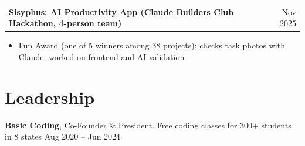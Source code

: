 \documentclass[10pt,letterpaper]{article}
\makeatletter
\newcommand{\entryshort}[2]{%
  \noindent\begin{tabular*}{\textwidth}{@{}l@{\extracolsep{\fill}}r@{}}
    \textbf{#1} & #2 \\
  \end{tabular*}\vspace{-1pt}}
\makeatother
\begin{document}
\entryshort{\href{https://github.com/matthewj5/sisyphus}{Sisyphus: AI Productivity App} (Claude Builders Club Hackathon, 4-person team)}{Nov 2025}
\begin{itemize}
  \item Fun Award (one of 5 winners among 38 projects): checks task photos with Claude; worked on frontend and AI validation
\end{itemize}

\section{Leadership}
\noindent\textbf{Basic Coding}, Co-Founder \& President. Free coding classes for 300+ students in 8 states \hfill Aug 2020 -- Jun 2024
\end{document}
